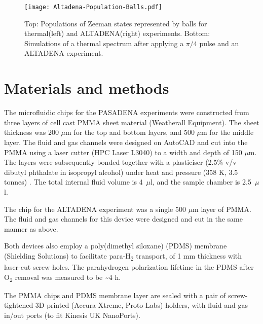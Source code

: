  \begin{figure}
   \begin{center}
   \texttt{[image: Altadena-Population-Balls.pdf]}
   \end{center}
   \caption{Top: Populations of Zeeman states represented by balls for thermal(left) and ALTADENA(right) experiments.
   Bottom: Simulations of a thermal spectrum after applying a $\pi/4$ pulse and an ALTADENA experiment.}
   \label{fig:ALTADENA}
 \end{figure}

\newpage

\section{Materials and methods}\label{pHMaterialandMethods}

The microfluidic chips for the PASADENA experiments were constructed from three layers of cell cast PMMA sheet
material (Weatherall Equipment). The sheet thickness was 200 $\mu$m for the
top and bottom layers, and 500 $\mu$m for the middle layer. The fluid and gas
channels were designed on AutoCAD and cut into the PMMA using a laser cutter
(HPC Laser L3040) to a width and depth of 150 $\mu$m. The layers were
subsequently bonded together with a plasticiser (2.5\% v/v dibutyl phthalate in
isopropyl alcohol) under heat and pressure (358 K, 3.5
tonnes) \cite{Yilmaz:2016fx}. The total internal fluid volume is 4~$\mu$l, and
the sample chamber is 2.5~$\mu$l.

The chip for the ALTADENA experiment was a single 500 $\mu$m layer of
PMMA. The fluid and gas channels for this device were designed and cut in
the same manner as above.

Both devices also employ a poly(dimethyl siloxane) (PDMS) membrane
(Shielding Solutions) to facilitate para-H\textsubscript{2} transport,
of 1 mm thickness with laser-cut screw holes. The parahydrogen
polarization lifetime in the PDMS after O\textsubscript{2} removal was
measured to be \textasciitilde{}4 h.

The PMMA chips and PDMS membrane layer are sealed with a pair of
screw-tightened 3D printed (Accura Xtreme, Proto Labs) holders, with
fluid and gas in/out ports (to fit Kinesis UK NanoPorts).

